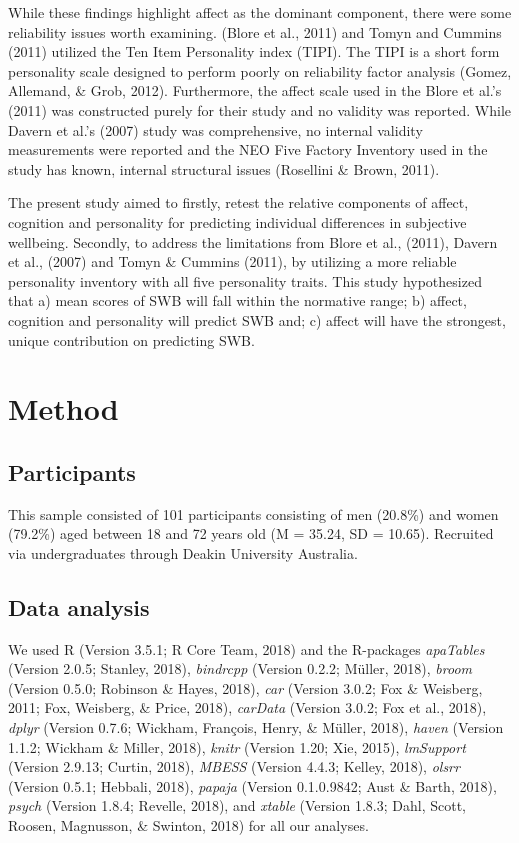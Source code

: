 \documentclass[man,floatsintext]{apa6}
\theoremstyle{definition}
\theoremstyle{definition}
\theoremstyle{definition}
\theoremstyle{remark}
\begin{document}
While these findings highlight affect as the dominant component, there
were some reliability issues worth examining. (Blore et al., 2011) and
Tomyn and Cummins (2011) utilized the Ten Item Personality index (TIPI).
The TIPI is a short form personality scale designed to perform poorly on
reliability factor analysis (Gomez, Allemand, \& Grob, 2012).
Furthermore, the affect scale used in the Blore et al.'s (2011) was
constructed purely for their study and no validity was reported. While
Davern et al.'s (2007) study was comprehensive, no internal validity
measurements were reported and the NEO Five Factory Inventory used in
the study has known, internal structural issues (Rosellini \& Brown,
2011).

The present study aimed to firstly, retest the relative components of
affect, cognition and personality for predicting individual differences
in subjective wellbeing. Secondly, to address the limitations from Blore
et al., (2011), Davern et al., (2007) and Tomyn \& Cummins (2011), by
utilizing a more reliable personality inventory with all five
personality traits. This study hypothesized that a) mean scores of SWB
will fall within the normative range; b) affect, cognition and
personality will predict SWB and; c) affect will have the strongest,
unique contribution on predicting SWB.

\section{Method}\label{method}

\subsection{Participants}\label{participants}

This sample consisted of 101 participants consisting of men (20.8\%) and
women (79.2\%) aged between 18 and 72 years old (M = 35.24, SD = 10.65).
Recruited via undergraduates through Deakin University Australia.

\subsection{Data analysis}\label{data-analysis}

We used R (Version 3.5.1; R Core Team, 2018) and the R-packages
\emph{apaTables} (Version 2.0.5; Stanley, 2018), \emph{bindrcpp}
(Version 0.2.2; Müller, 2018), \emph{broom} (Version 0.5.0; Robinson \&
Hayes, 2018), \emph{car} (Version 3.0.2; Fox \& Weisberg, 2011; Fox,
Weisberg, \& Price, 2018), \emph{carData} (Version 3.0.2; Fox et al.,
2018), \emph{dplyr} (Version 0.7.6; Wickham, François, Henry, \& Müller,
2018), \emph{haven} (Version 1.1.2; Wickham \& Miller, 2018),
\emph{knitr} (Version 1.20; Xie, 2015), \emph{lmSupport} (Version
2.9.13; Curtin, 2018), \emph{MBESS} (Version 4.4.3; Kelley, 2018),
\emph{olsrr} (Version 0.5.1; Hebbali, 2018), \emph{papaja} (Version
0.1.0.9842; Aust \& Barth, 2018), \emph{psych} (Version 1.8.4; Revelle,
2018), and \emph{xtable} (Version 1.8.3; Dahl, Scott, Roosen, Magnusson,
\& Swinton, 2018) for all our analyses.
\end{document}
